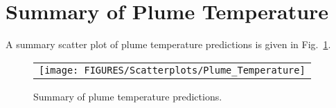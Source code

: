 %
%
%
%

\clearpage


\section{Summary of Plume Temperature}

A summary scatter plot of plume temperature predictions is given in Fig.~\ref{plume_temperature_summary}. 

\begin{figure}[ht]
\begin{center}
\begin{tabular}{l}
\texttt{[image: FIGURES/Scatterplots/Plume\_Temperature]}
\end{tabular}
\end{center}
\caption[Summary of plume temperature predictions.]
{Summary of plume temperature predictions.}
\label{plume_temperature_summary}
\end{figure}

